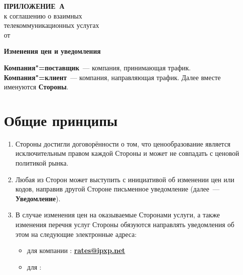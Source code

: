 


\begin{Form}
\appendix
  
  \begin{raggedleft}
    \hfill\parbox{5.8cm}{
    \textbf{ПРИЛОЖЕНИЕ~А}\\
    к соглашению о взаимных\\
    телекоммуникационных услугах\\
    от \underline{\TextField[name=contractdate,charsize=10pt,width=5em,height=1em,borderwidth=0,
    bordercolor={1 1 1},align=0]{}}~\No~\underline{\TextField[name=contractnum,charsize=10pt,width=6em,
    height=1em,borderwidth=0,bordercolor={1 1 1},align=0]{}}
    }
  \end{raggedleft}

  \baselineskip

  \begin{center}
    \textbf{\Large{Изменения цен и уведомления}}
  \end{center}
  
  
  \par\textbf{Компания"=поставщик}~--- компания, принимающая трафик. \textbf{Компания"=клиент}~---
  компания, направляющая трафик. Далее вместе именуются \textbf{Стороны}.

 \section{Общие принципы}\label{anx:a-ru}

     \begin{enumerate}[label=\thesection.\arabic*.]
      \item Стороны достигли договорённости о том, что ценообразование является исключительным правом
        каждой Стороны и может не совпадать с ценовой политикой рынка. 
      \item Любая из Сторон может выступить с инициативой об изменении цен или
        кодов, направив другой Стороне письменное уведомление (далее~--- \textbf{\flqq{}Уведомление\frqq{}}).
      \item В случае изменения цен на оказываемые Сторонами услуги, а также изменения
        перечня услуг Стороны обязуются направлять уведомления об этом на
        следующие электронные адреса: 
      
        \begin{itemize}
        \item для компании \textbf{\ipxpname}: \href{mailto:rates@ipxp.net}{\textbf{rates@ipxp.net}}
          \item для \underline{\TextField[name=clntname,charsize=10pt,width=19em,height=1em,borderwidth=0,bordercolor={1 1 1}]{}}:
              \underline{\TextField[name=clntratesemail,charsize=10pt,width=75mm,height=1em,borderwidth=0,
              bordercolor={1 1 1}]{}}
              \\[\medskipamount]
              \underline{\TextField[name=clntratesemailnext,charsize=10pt,width=151mm,height=1em,borderwidth=0,
              bordercolor={1 1 1}]{}}             


\end{itemize}
\end{enumerate}
\end{Form}
